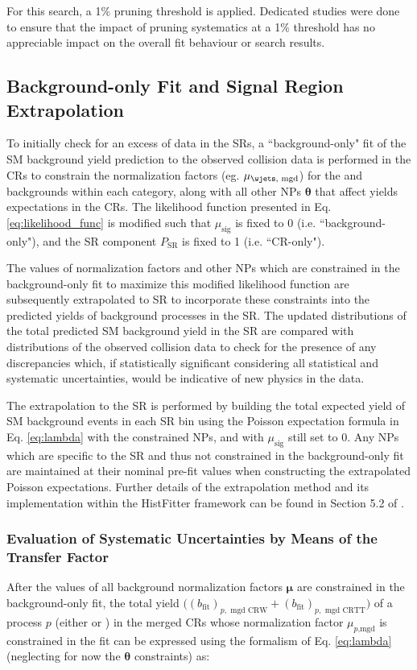 For this search, a 1\% pruning threshold is applied. Dedicated studies were done to ensure that the impact of pruning systematics at a 1\% threshold has no appreciable impact on the overall fit behaviour or search results. 

\subsection{Background-only Fit and Signal Region Extrapolation}
\label{sec:extrapolation}

To initially check for an excess of data in the SRs, a ``background-only" fit of the SM background yield prediction to the observed collision data is performed in the CRs to constrain the normalization factors (eg. \(\mu_\text{\wjets, mgd}\)) for the \wjets and \ttbar backgrounds within each category, along with all other NPs \(\boldsymbol{\theta}\) that affect yields expectations in the CRs. The likelihood function presented in Eq. \ref{eq:likelihood_func} is modified such that \(\mu_\text{sig}\) is fixed to 0 (i.e. ``background-only"), and the SR component \(P_\text{SR}\) is fixed to 1 (i.e. ``CR-only"). 

The values of normalization factors and other NPs which are constrained in the background-only fit to maximize this modified likelihood function are subsequently extrapolated to SR to incorporate these constraints into the predicted yields of background processes in the SR. The updated distributions of the total  predicted SM background yield in the SR are compared with distributions of the observed collision data to check for the presence of any  discrepancies which, if statistically significant considering all statistical and systematic uncertainties, would be indicative of new physics in the data. 

The extrapolation to the SR is performed by building the total expected yield of SM background events in each SR bin using the Poisson expectation formula in Eq. \ref{eq:lambda} with the constrained NPs, and with \(\mu_\text{sig}\) still set to 0. Any NPs which are specific to the SR and thus not constrained in the background-only fit are maintained at their nominal pre-fit values when constructing the extrapolated Poisson expectations. Further details of the extrapolation method and its implementation within the HistFitter framework can be found in Section 5.2 of .

\subsubsection{Evaluation of Systematic Uncertainties by Means of the Transfer Factor}
\label{sec:TF}
After the values of all background normalization factors \(\boldsymbol{\mu}\) are constrained in the background-only fit, the total yield \(\big((b_\text{fit})_{p,\text{ mgd CRW}} + 
(b_\text{fit})_{p,\text{ mgd CRTT}}\big)\) of a process \(p\) (either \wjets or \ttbar) in the merged CRs whose normalization factor \(\mu_{p\text{,mgd}}\) is constrained in the fit can be expressed using the formalism of Eq. \ref{eq:lambda} (neglecting for now the \(\boldsymbol{\theta}\) constraints) as:

